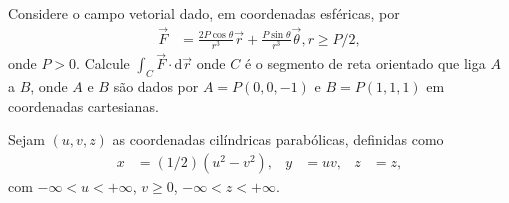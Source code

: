 \documentclass[a4paper,12pt, leqno, answers]{exam}
\begin{document}
\begin{questions}

    \question[E de 2010] Considere o campo vetorial dado, em coordenadas esf\'{e}ricas, por
    \begin{align*}
        \vec{F} &= \frac{2 P \cos \theta}{r^3} \vec{r} + \frac{P \sin \theta}{r^3} \vec{\theta}, r \geq P/2,
    \end{align*}
    onde $P > 0$. Calcule $\int_C \vec{F} \cdot \mathrm{d}\vec{r}$ onde $C$ \'{e} o segmento de reta orientado que liga $A$ a $B$, onde $A$ e $B$ s\~{a}o dados por $A = P(0,0,-1)$ e $B = P(1,1,1)$ em coordenadas cartesianas.
    \begin{solution}
    \end{solution}

    \question[T1 de 2011] Sejam $(u, v, z)$ as coordenadas cil\'{i}ndricas parab\'{o}licas, definidas como
    \begin{align*}
        x &= (1/2)(u^2 - v^2), & y &= uv, & z &= z,
    \end{align*}
    com $-\infty < u < +\infty$, $v \geq 0$, $-\infty < z < +\infty$.
    \begin{parts}

\end{parts}
\end{questions}
\end{document}
